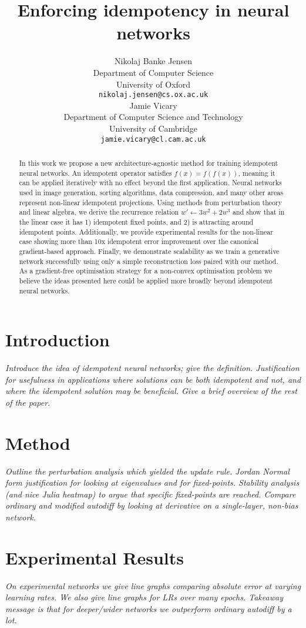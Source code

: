 \documentclass{article}
\title{Enforcing idempotency in neural networks}
\author{%
  Nikolaj Banke Jensen \\ %
  Department of Computer Science\\
  University of Oxford\\
  \texttt{nikolaj.jensen@cs.ox.ac.uk} \\
  \And
  Jamie Vicary \\
  Department of Computer Science and Technology \\
  University of Cambridge \\
  \texttt{jamie.vicary@cl.cam.ac.uk} \\
}
\begin{document}
\maketitle


\begin{abstract}
  In this work we propose a new architecture-agnostic method for training idempotent neural networks. An idempotent operator satisfies $f(x) = f(f(x))$, meaning it can be applied iteratively with no effect beyond the first application. Neural networks used in image generation, sorting algorithms, data compression, and many other areas represent non-linear idempotent projections. Using methods from perturbation theory and linear algebra, we derive the recurrence relation ${w' \leftarrow 3w^2 + 2w^3}$ and show that in the linear case it has 1) idempotent fixed points, and 2) is attracting around idempotent points. Additionally, we provide experimental results for the non-linear case showing more than 10x idempotent error improvement over the canonical gradient-based approach. Finally, we demonstrate scalability as we train a generative network successfully using only a simple reconstruction loss paired with our method. As a gradient-free optimisation strategy for a non-convex optimisation problem we believe the ideas presented here could be applied more broadly beyond idempotent neural networks.
\end{abstract}


\section{Introduction}
\textit{Introduce the idea of idempotent neural networks; give the definition. Justification for usefulness in applications where solutions can be both idempotent and not, and where the idempotent solution may be beneficial. Give a brief overview of the rest of the paper.}

\section{Method}
\textit{Outline the perturbation analysis which yielded the update rule. Jordan Normal form justification for looking at eigenvalues and for fixed-points. Stability analysis (and nice Julia heatmap) to argue that specific fixed-points are reached. Compare ordinary and modified autodiff by looking at derivative on a single-layer, non-bias network.}

\section{Experimental Results}
\textit{On experimental networks we give line graphs comparing absolute error at varying learning rates. We also give line graphs for LRs over many epochs. Takeaway message is that for deeper/wider networks we outperform ordinary autodiff by a lot.}
\end{document}
